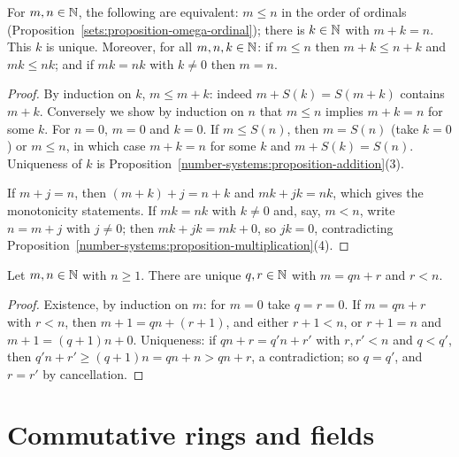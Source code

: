 \begin{proposition}\label{number-systems:proposition-order-naturals}
For $m, n \in \mathbb{N}$, the following are equivalent: $m \leq n$ in the order of
ordinals (Proposition~\ref{sets:proposition-omega-ordinal}); there is
$k \in \mathbb{N}$ with $m + k = n$. This $k$ is unique. Moreover, for all
$m, n, k \in \mathbb{N}$: if $m \leq n$ then $m + k \leq n + k$ and $mk \leq nk$; and if
$mk = nk$ with $k \neq 0$ then $m = n$.
\end{proposition}

\begin{proof}
By induction on $k$, $m \leq m + k$: indeed $m + S(k) = S(m + k)$ contains
$m + k$. Conversely we show by induction on $n$ that $m \leq n$ implies
$m + k = n$ for some $k$. For $n = 0$, $m = 0$ and $k = 0$. If $m \leq S(n)$,
then $m = S(n)$ (take $k = 0$) or $m \leq n$, in which case $m + k = n$ for
some $k$ and $m + S(k) = S(n)$. Uniqueness of $k$ is
Proposition~\ref{number-systems:proposition-addition}(3).

If $m + j = n$, then $(m + k) + j = n + k$ and $mk + jk = nk$, which gives the
monotonicity statements. If $mk = nk$ with $k \neq 0$ and, say, $m < n$, write
$n = m + j$ with $j \neq 0$; then $mk + jk = mk + 0$, so $jk = 0$, contradicting
Proposition~\ref{number-systems:proposition-multiplication}(4).
\end{proof}

\begin{proposition}\label{number-systems:proposition-division-naturals}
Let $m, n \in \mathbb{N}$ with $n \geq 1$. There are unique $q, r \in \mathbb{N}$ with
$m = qn + r$ and $r < n$.
\end{proposition}

\begin{proof}
Existence, by induction on $m$: for $m = 0$ take $q = r = 0$. If $m = qn + r$ with
$r < n$, then $m + 1 = qn + (r + 1)$, and either $r + 1 < n$, or $r + 1 = n$ and
$m + 1 = (q + 1)n + 0$. Uniqueness: if $qn + r = q'n + r'$ with $r, r' < n$ and
$q < q'$, then $q'n + r' \geq (q + 1)n = qn + n > qn + r$, a contradiction; so
$q = q'$, and $r = r'$ by cancellation.
\end{proof}

\section{Commutative rings and fields}\label{number-systems:section-rings-fields}

